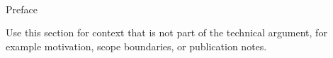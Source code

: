\pagestyle{plain} \setcounter{page}{2}
\renewcommand{\baselinestretch}{2}
\small\normalsize
\hbox{\ }

\vspace*{-.85in}

\begin{center}
\large{Preface}
\end{center}

Use this section for context that is not part of the technical argument,
for example motivation, scope boundaries, or publication notes.
